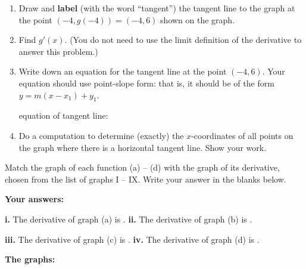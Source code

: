 \documentclass[12pt]{article}
\renewcommand{\emph}[1]{\textsf{\textbf{#1}}}
\newcounter{probcount}
\newcounter{subprobcount}
\def\problem#1{\setcounter{subprobcount}{0}%
\addtocounter{probcount}{1}{\emph{\arabic{probcount}.\hskip 1em(#1)}}\par}
\newenvironment{subproblems}{%
\begin{enumerate}%
\setcounter{enumi}{\value{subprobcount}}%
\renewcommand{\theenumi}{\emph{\alph{enumi}}}}%
{\setcounter{subprobcount}{\value{enumi}}\end{enumerate}}
\newcommand{\be}{\begin{enumerate}}
\newcommand{\ee}{\end{enumerate}}
\begin{document}

\begin{subproblems}
\item Draw and \emph{label} (with the word ``tangent'') the tangent line to the graph at the point $(-4, g(-4)) = (-4,6)$ shown on the graph.
  \item Find $g'(x)$. %
  (You do not need to use the limit definition of the derivative to answer this problem.)
  
  \vfill %
  \item Write down an equation for the tangent line at the point $(-4,6)$. Your equation should use point-slope form: that is, it should be of the form $y = m(x-x_{1})+y_{1}$.
  
  
    \vfill
    
  equation of tangent line: \hrulefill
  
  \item Do a computation to determine (exactly) the $x$-coordinates of all points on the graph where there is a horizontal tangent line. Show your work.
  
  \vfill
  
  \vfill
  
  \vfill




\end{subproblems}

\newpage

\problem{8 points} Match the graph of each function (a) -- (d) with the graph of its derivative, chosen from the list of graphs I -- IX. Write your answer in the blanks below.

\hrulefill

\emph{Your answers:}
 
 \emph{i.} The derivative of graph (a) is \ans. \hfill  \emph{ii.} The derivative of graph (b) is \ans.
 
  \emph{iii.} The derivative of graph (c) is \ans. \hfill  \emph{iv.} The derivative of graph (d) is \ans.
 
 \hrulefill
 
 \emph{The graphs:}
 
\end{document}
